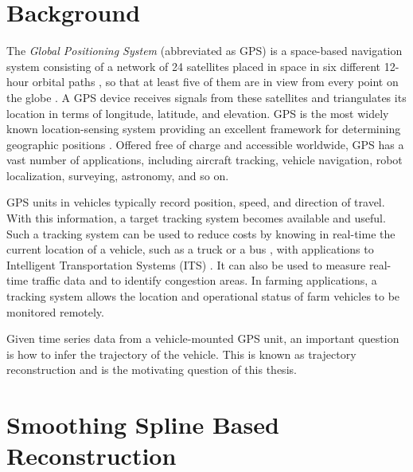 

\section{Background}


The \textit{Global Positioning System} (abbreviated as GPS) is a space-based navigation system consisting of a network of 24 satellites placed in space in six different 12-hour orbital paths \citep{agrawal2015introduction}, so that at least five of them are in view from every point on the globe \citep{kaplan2005understanding, bajaj2002gps}. A GPS device receives signals from these satellites and triangulates its location in terms of longitude, latitude, and elevation. GPS is the most widely known location-sensing system providing an excellent framework for determining geographic positions \citep{hightower2001location}. Offered free of charge and accessible worldwide, GPS has a vast number of applications, including aircraft tracking, vehicle navigation, robot localization, surveying, astronomy, and so on. 

GPS units in vehicles typically record position, speed, and direction of travel. With this information, a target tracking system becomes available and useful. Such a tracking system can be used to reduce costs by knowing in real-time the current location of a vehicle, such as a truck or a bus \citep{chadil2008real}, with applications to  Intelligent Transportation Systems (ITS) \citep{mcdonald2006intelligent}. It can also be used to measure real-time traffic data and to identify congestion areas. In farming applications, a tracking system allows the location and operational status of farm vehicles to be monitored remotely. 

Given time series data from a vehicle-mounted GPS unit, an important question is how to infer the trajectory of the vehicle. This is known as trajectory reconstruction and is the motivating question of this thesis. 



\section{Smoothing Spline Based Reconstruction}

